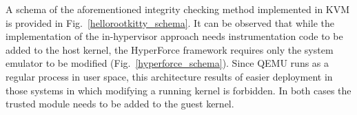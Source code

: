%
%
A schema of the aforementioned integrity checking method implemented in KVM is provided in Fig.~\ref{hellorootkitty_schema}. It can be observed that while the implementation of the in-hypervisor approach needs instrumentation code to be added to the host kernel, the HyperForce framework requires only the system emulator to be modified (Fig.~\ref{hyperforce_schema}). Since QEMU runs as a regular process in user space, this architecture results of easier deployment in those systems in which modifying a running kernel is forbidden.  
In both cases the trusted module needs to be added to the guest kernel.\\


